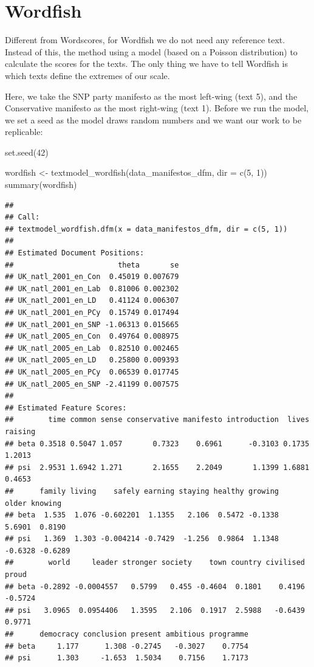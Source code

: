 \documentclass[
]{book}
\newenvironment{Shaded}{\begin{snugshade}}{\end{snugshade}}
\newcommand{\AttributeTok}[1]{\textcolor[rgb]{0.77,0.63,0.00}{#1}}
\newcommand{\DecValTok}[1]{\textcolor[rgb]{0.00,0.00,0.81}{#1}}
\newcommand{\FunctionTok}[1]{\textcolor[rgb]{0.00,0.00,0.00}{#1}}
\newcommand{\NormalTok}[1]{#1}
\newcommand{\OtherTok}[1]{\textcolor[rgb]{0.56,0.35,0.01}{#1}}
\begin{document}
\hypertarget{wordfish}{%
\section{Wordfish}\label{wordfish}}

Different from Wordscores, for Wordfish we do not need any reference text. Instead of this, the method using a model (based on a Poisson distribution) to calculate the scores for the texts. The only thing we have to tell Wordfish is which texts define the extremes of our scale.

Here, we take the SNP party manifesto as the most left-wing (text 5), and the Conservative manifesto as the most right-wing (text 1). Before we run the model, we set a seed as the model draws random numbers and we want our work to be replicable:

\begin{Shaded}
\begin{Highlighting}[]
\FunctionTok{set.seed}\NormalTok{(}\DecValTok{42}\NormalTok{)}

\NormalTok{wordfish }\OtherTok{\textless{}{-}} \FunctionTok{textmodel\_wordfish}\NormalTok{(data\_manifestos\_dfm, }\AttributeTok{dir =} \FunctionTok{c}\NormalTok{(}\DecValTok{5}\NormalTok{, }
    \DecValTok{1}\NormalTok{))}
\FunctionTok{summary}\NormalTok{(wordfish)}
\end{Highlighting}
\end{Shaded}

\begin{verbatim}
## 
## Call:
## textmodel_wordfish.dfm(x = data_manifestos_dfm, dir = c(5, 1))
## 
## Estimated Document Positions:
##                        theta       se
## UK_natl_2001_en_Con  0.45019 0.007679
## UK_natl_2001_en_Lab  0.81006 0.002302
## UK_natl_2001_en_LD   0.41124 0.006307
## UK_natl_2001_en_PCy  0.15749 0.017494
## UK_natl_2001_en_SNP -1.06313 0.015665
## UK_natl_2005_en_Con  0.49764 0.008975
## UK_natl_2005_en_Lab  0.82510 0.002465
## UK_natl_2005_en_LD   0.25800 0.009393
## UK_natl_2005_en_PCy  0.06539 0.017745
## UK_natl_2005_en_SNP -2.41199 0.007575
## 
## Estimated Feature Scores:
##        time common sense conservative manifesto introduction  lives raising
## beta 0.3518 0.5047 1.057       0.7323    0.6961      -0.3103 0.1735  1.2013
## psi  2.9531 1.6942 1.271       2.1655    2.2049       1.1399 1.6881  0.4653
##      family living    safely earning staying healthy growing   older knowing
## beta  1.535  1.076 -0.602201  1.1355   2.106  0.5472 -0.1338  5.6901  0.8190
## psi   1.369  1.303 -0.004214 -0.7429  -1.256  0.9864  1.1348 -0.6328 -0.6289
##        world     leader stronger society    town country civilised   proud
## beta -0.2892 -0.0004557   0.5799   0.455 -0.4604  0.1801    0.4196 -0.5724
## psi   3.0965  0.0954406   1.3595   2.106  0.1917  2.5988   -0.6439  0.9771
##      democracy conclusion present ambitious programme
## beta     1.177      1.308 -0.2745   -0.3027    0.7754
## psi      1.303     -1.653  1.5034    0.7156    1.7173
\end{verbatim}
\end{document}
